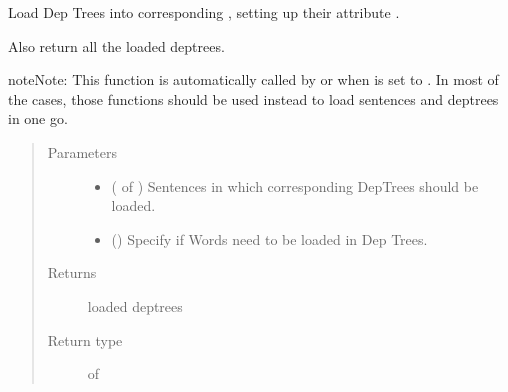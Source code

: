 \documentclass[letterpaper,10pt,english]{sphinxmanual}
\begin{document}
\begin{fulllineitems}
\label{\detokenize{load:loacore.load.deptree_load.load_dep_tree_in_sentences}}
Load Dep Trees into corresponding , setting up their attribute .

Also return all the loaded deptrees.

\begin{sphinxadmonition}{note}{Note:}
This function is automatically called by  or
 when  is set to .
In most of the cases, those functions should be used instead to load sentences and deptrees in one go.
\end{sphinxadmonition}
\begin{quote}\begin{description}
\item[{Parameters}] \leavevmode\begin{itemize}
\item {} 
 ( of {\hyperref[\detokenize{classes:loacore.classes.classes.Sentence}]{}}) \textendash{} Sentences in which corresponding DepTrees should be loaded.

\item {} 
 () \textendash{} Specify if Words need to be loaded in Dep Trees.

\end{itemize}

\item[{Returns}] \leavevmode
loaded deptrees

\item[{Return type}] \leavevmode
{} of {\hyperref[\detokenize{classes:loacore.classes.classes.DepTree}]{}}

\end{description}\end{quote}

\end{fulllineitems}
\end{document}
